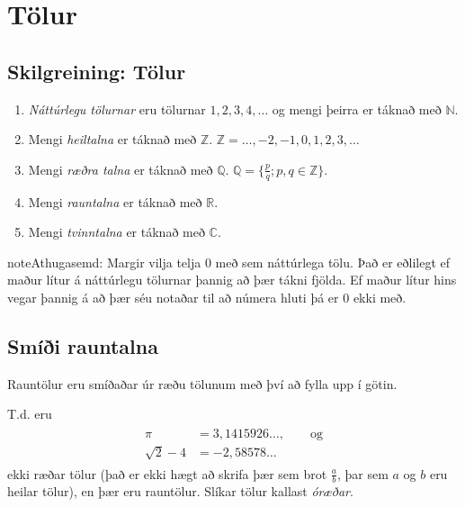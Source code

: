 \documentclass[a4paper,10pt,icelandic]{sphinxmanual}
\begin{document}
\section{Tölur}
\label{kafli01:tolur}

\subsection{Skilgreining: Tölur}
\label{kafli01:index-0}\label{kafli01:skilgreining-tolur}\begin{enumerate}
\item {} 
\textit{Náttúrlegu tölurnar} eru tölurnar \(1, 2, 3, 4, \ldots\) og
mengi þeirra er táknað með \(\mathbb{N}\).

\item {} 
Mengi \textit{heiltalna} er táknað með \(\mathbb{Z}\).
\(\mathbb{Z}= \ldots,-2,-1,0,1,2,3,\ldots\)

\item {} 
Mengi \textit{ræðra talna} er táknað með \(\mathbb{Q}\).
\(\mathbb{Q}= \{ \frac pq ; p,q \in \mathbb{Z}\}\).

\item {} 
Mengi \textit{rauntalna} er táknað með \(\mathbb{R}\).

\item {} 
Mengi \textit{tvinntalna} er táknað með \(\mathbb{C}\).

\end{enumerate}

\begin{notice}{note}{Athugasemd:}
Margir vilja telja \(0\) með sem náttúrlega tölu. Það
er eðlilegt ef maður lítur á náttúrlegu tölurnar þannig að þær tákni
fjölda. Ef maður lítur hins vegar þannig á að þær séu notaðar til að
númera hluti þá er 0 ekki með.
\end{notice}


\subsection{Smíði rauntalna}
\label{kafli01:smii-rauntalna}
Rauntölur eru smíðaðar úr ræðu tölunum með því að
fylla upp í götin.

T.d. eru
\begin{equation*}
\begin{split}\begin{aligned}
\pi &= 3,1415926\ldots, \qquad \text{og}\\
\sqrt 2 -4  &= -2,58578\ldots\end{aligned}\end{split}
\end{equation*}
ekki ræðar tölur (það er ekki hægt að skrifa þær sem brot
\(\frac ab\), þar sem \(a\) og \(b\) eru heilar tölur), en
þær eru rauntölur. Slíkar tölur kallast \textit{óræðar}.
\end{document}

